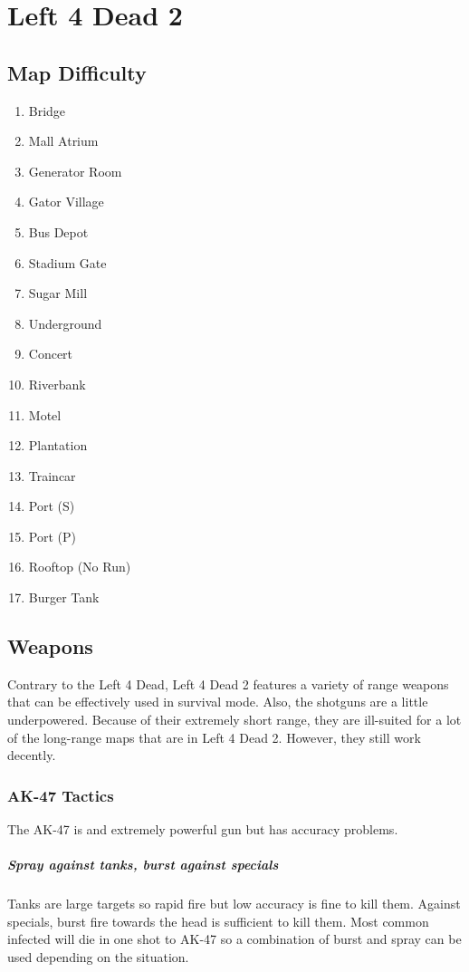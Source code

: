 \chapter{Left 4 Dead 2}

\section{Map Difficulty}
\begin{enumerate}
\item Bridge
\item Mall Atrium
\item Generator Room
\item Gator Village
\item Bus Depot
\item Stadium Gate
\item Sugar Mill
\item Underground
\item Concert
\item Riverbank
\item Motel
\item Plantation
\item Traincar
\item Port (S)
\item Port (P)
\item Rooftop (No Run)
\item Burger Tank
\end{enumerate}

\section{Weapons}
Contrary to the Left 4 Dead, Left 4 Dead 2 features a variety of range weapons that can be effectively used in survival mode. Also, the shotguns are a little underpowered. Because of their extremely short range, they are ill-suited for a lot of the long-range maps that are in Left 4 Dead 2. However, they still work decently.

\subsection{AK-47 Tactics}
The AK-47 is and extremely powerful gun but has accuracy problems.

\paragraph{Spray against tanks, burst against specials}
Tanks are large targets so rapid fire but low accuracy is fine to kill them. Against specials, burst fire towards the head is sufficient to kill them. Most common infected will die in one shot to AK-47 so a combination of burst and spray can be used depending on the situation.

